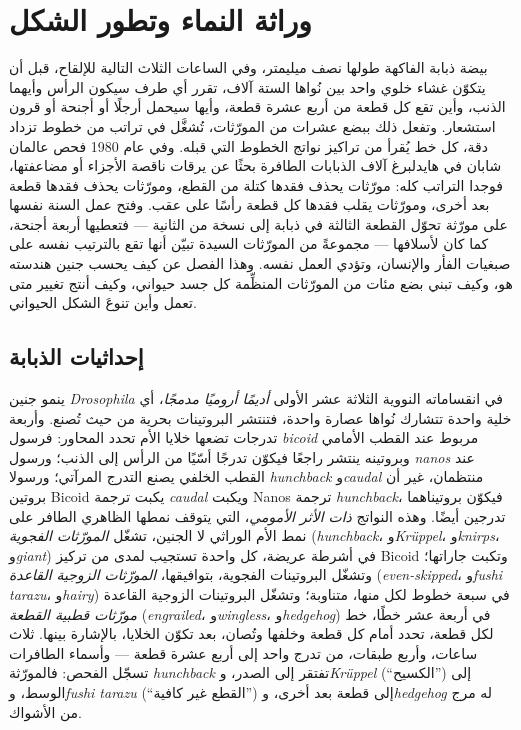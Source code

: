 \chapter{وراثة النماء وتطور الشكل}\label{ch:b3:developmental-genetics}

بيضة ذبابة الفاكهة طولها نصف ميليمتر، وفي الساعات الثلاث
التالية للإلقاح، قبل أن يتكوّن غشاء خلوي واحد بين نُواها
الستة آلاف، تقرر أي طرف سيكون الرأس وأيهما الذنب، وأين تقع
كل قطعة من أربع عشرة قطعة، وأيها سيحمل أرجلًا أو أجنحة أو
قرون استشعار. وتفعل ذلك ببضع عشرات من المورّثات، تُشغَّل في
تراتب من خطوط تزداد دقة، كل خط يُقرأ من تراكيز نواتج الخطوط
التي قبله. وفي عام 1980 فحص عالمان شابان في هايدلبرغ آلاف
الذبابات الطافرة بحثًا عن يرقات ناقصة الأجزاء أو مضاعفتها،
فوجدا التراتب كله: مورّثات يحذف فقدها كتلة من القطع،
ومورّثات يحذف فقدها قطعة بعد أخرى، ومورّثات يقلب فقدها كل
قطعة رأسًا على عقب. وفتح عمل السنة نفسها على مورّثة تحوّل
القطعة الثالثة في ذبابة إلى نسخة من الثانية --- فتعطيها
أربعة أجنحة، كما كان لأسلافها --- مجموعةً من المورّثات
السيدة تبيّن أنها تقع بالترتيب نفسه على صبغيات الفأر
والإنسان، وتؤدي العمل نفسه. وهذا الفصل عن كيف يحسب جنين
هندسته هو، وكيف تبني بضع مئات من المورّثات المنظِّمة كل جسد
حيواني، وكيف أنتج تغيير متى تعمل وأين تنوعَ الشكل الحيواني.

\section{إحداثيات الذبابة}

\begin{definition}\label{def:b3:developmental-genetics:hierarchy}
ينمو جنين \emph{Drosophila} في انقساماته النووية الثلاثة عشر
الأولى \emph{أديمًا أروميًا مدمجًا}، أي خلية واحدة تتشارك
نُواها عصارة واحدة، فتنتشر البروتينات بحرية من حيث تُصنع.
وأربعة تدرجات تضعها خلايا الأم تحدد المحاور: فرسول
\emph{bicoid} مربوط عند القطب الأمامي وبروتينه ينتشر راجعًا
فيكوّن تدرجًا أسّيًا من الرأس إلى الذنب؛ ورسول \emph{nanos}
عند القطب الخلفي يصنع التدرج المرآتي؛ ورسولا
\emph{hunchback} و\emph{caudal} منتظمان، غير أن بروتين Bicoid
يكبت ترجمة \emph{caudal} ويكبت Nanos ترجمة
\emph{hunchback}، فيكوّن بروتيناهما تدرجين أيضًا. وهذه
النواتج \emph{ذات الأثر الأمومي}، التي يتوقف نمطها الظاهري
الطافر على نمط الأم الوراثي لا الجنين، تشغّل \emph{المورّثات
الفجوية} (\emph{hunchback}، و\emph{Krüppel}، و\emph{knirps}،
و\emph{giant}) في أشرطة عريضة، كل واحدة تستجيب لمدى من تركيز
Bicoid وتكبت جاراتها؛ وتشغّل البروتينات الفجوية، بتوافيقها،
\emph{المورّثات الزوجية القاعدة} (\emph{even-skipped}،
و\emph{fushi tarazu}، و\emph{hairy}) في سبعة خطوط لكل منها،
متناوبة؛ وتشغّل البروتينات الزوجية القاعدة \emph{مورّثات
قطبية القطعة} (\emph{engrailed}، و\emph{wingless}،
و\emph{hedgehog}) في أربعة عشر خطًا، خط لكل قطعة، تحدد أمام
كل قطعة وخلفها وتُصان، بعد تكوّن الخلايا، بالإشارة بينها.
ثلاث ساعات، وأربع طبقات، من تدرج واحد إلى أربع عشرة قطعة ---
وأسماء الطافرات تسجّل الفحص: فالمورّثة \emph{hunchback} تفتقر إلى
الصدر، و\emph{Krüppel} (``الكسيح'') إلى الوسط،
و\emph{fushi tarazu} (``القطع غير كافية'') إلى قطعة بعد أخرى،
و\emph{hedgehog} له مرج من الأشواك.
\end{definition}

